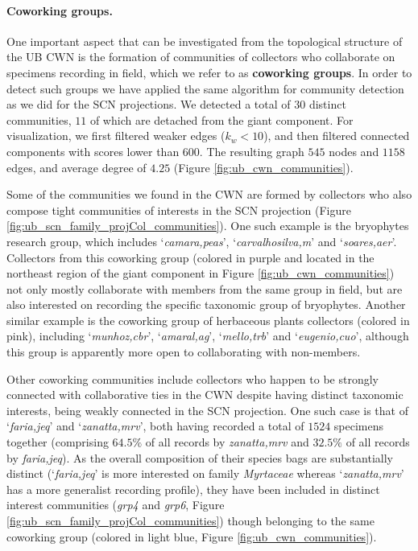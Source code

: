 \paragraph{Coworking groups.}

One important aspect that can be investigated from the topological structure of the UB CWN is the formation of communities of collectors who collaborate on specimens recording in field, which we refer to as \textbf{coworking groups}. 
%
In order to detect such groups we have applied the same algorithm for community detection \cite{Blondel2008} as we did for the SCN projections.
%
We detected a total of $30$ distinct communities, $11$ of which are detached from the giant component.
%
For visualization, we first filtered weaker edges ($k_w < 10$), and then filtered connected components with scores lower than $600$.
The resulting graph $545$ nodes and $1158$ edges, and average degree of $4.25$ (Figure \ref{fig:ub_cwn_communities}).

Some of the communities we found in the CWN are formed by collectors who also compose tight communities of interests in the SCN projection (Figure \ref{fig:ub_scn_family_projCol_communities}).
%
One such example is the bryophytes research group, which includes `\textit{camara,peas}', `\textit{carvalhosilva,m}' and `\textit{soares,aer}'.
Collectors from this coworking group (colored in purple and located in the northeast region of the giant component in Figure \ref{fig:ub_cwn_communities}) not only mostly collaborate with members from the same group in field, but are also interested on recording the specific taxonomic group of bryophytes.
%
Another similar example is the coworking group of herbaceous plants collectors (colored in pink), including `\textit{munhoz,cbr}', `\textit{amaral,ag}', `\textit{mello,trb}' and `\textit{eugenio,cuo}', although this group is apparently more open to collaborating with non-members.

Other coworking communities include collectors who happen to be strongly connected with collaborative ties in the CWN despite having distinct taxonomic interests, being weakly connected in the SCN projection.
One such case is that of `\textit{faria,jeq}' and `\textit{zanatta,mrv}', both having recorded a total of $1524$ specimens together (comprising $64.5\%$ of all records by \textit{zanatta,mrv} and $32.5\%$ of all records by \textit{faria,jeq}).
As the overall composition of their species bags are substantially distinct (`\textit{faria,jeq}' is more interested on family \textit{Myrtaceae} whereas `\textit{zanatta,mrv}' has a more generalist recording profile), they have been included in distinct interest communities (\textit{grp4} and \textit{grp6}, Figure \ref{fig:ub_scn_family_projCol_communities}) though belonging to the same coworking group (colored in light blue, Figure \ref{fig:ub_cwn_communities}).

